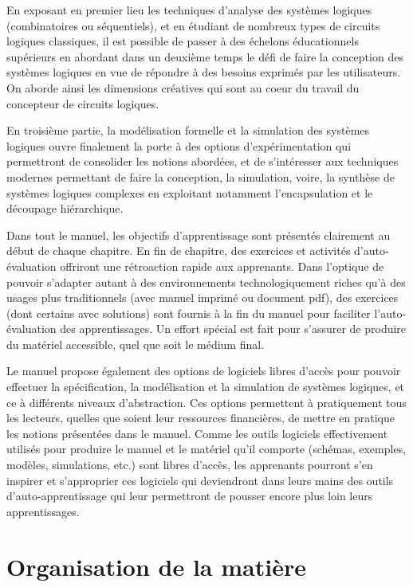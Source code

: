 \documentclass[letter, oneside]{book}
\begin{document}
En exposant en premier lieu les techniques d'analyse des systèmes
logiques (combinatoires ou séquentiels), et en étudiant de nombreux
types de circuits logiques classiques, il est possible de passer à des
échelons éducationnels supérieurs en abordant dans un deuxième temps
le défi de faire la conception des systèmes logiques en vue de
répondre à des besoins exprimés par les utilisateurs.  On aborde ainsi
les dimensions créatives qui sont au coeur du travail du concepteur de
circuits logiques.

En troisième partie, la modélisation formelle et la simulation des
systèmes logiques ouvre finalement la porte à des options
d'expérimentation qui permettront de consolider les notions abordées,
et de s'intéresser aux techniques modernes permettant de faire la
conception, la simulation, voire, la synthèse de systèmes logiques
complexes en exploitant notamment l'encapsulation et le découpage
hiérarchique.

Dans tout le manuel, les objectifs d'apprentissage sont présentés
clairement au début de chaque chapitre.  En fin de chapitre, des
exercices et activités d'auto-évaluation offriront une rétroaction
rapide aux apprenants. Dans l'optique de pouvoir s'adapter autant à
des environnements technologiquement riches qu'à des usages plus
traditionnels (avec manuel imprimé ou document pdf), des exercices
(dont certains avec solutions) sont fournis à la fin du manuel pour
faciliter l'auto-évaluation des apprentissages.  Un effort spécial est
fait pour s'assurer de produire du matériel accessible, quel que soit
le médium final.

Le manuel propose également des options de logiciels libres d'accès
pour pouvoir effectuer la spécification, la modélisation et la
simulation de systèmes logiques, et ce à différents niveaux
d'abstraction. Ces options permettent à pratiquement tous les
lecteurs, quelles que soient leur ressources financières, de mettre en
pratique les notions présentées dans le manuel. Comme les outils
logiciels effectivement utilisés pour produire le manuel et le
matériel qu'il comporte (schémas, exemples, modèles, simulations,
etc.) sont libres d'accès, les apprenants pourront s'en inspirer et
s'approprier ces logiciels qui deviendront dans leurs mains des outils
d'auto-apprentissage qui leur permettront de pousser encore plus loin
leurs apprentissages.

\section*{Organisation de la matière}
\label{sec:org83210cd}
\end{document}
